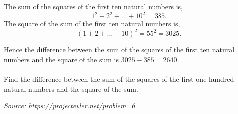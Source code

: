 \vspace{10pt}
\begin{graybox}
The sum of the squares of the first ten natural numbers is,
\[1^2 + 2^2 + \ldots + 10^2 = 385.\]
The square of the sum of the first ten natural numbers is,
\[(1 + 2 + \ldots + 10)^2 = 55^2 = 3025.\]

Hence the difference between the sum of the squares of the first ten natural numbers and the square of the sum is $3025 - 385 = 2640$.\\~\\
Find the difference between the sum of the squares of the first one hundred natural numbers and the square of the sum.
\begin{flushleft}  %
{\color{gray}\textit{Source: \url{https://projecteuler.net/problem=6}}}
\end{flushleft}
\end{graybox}